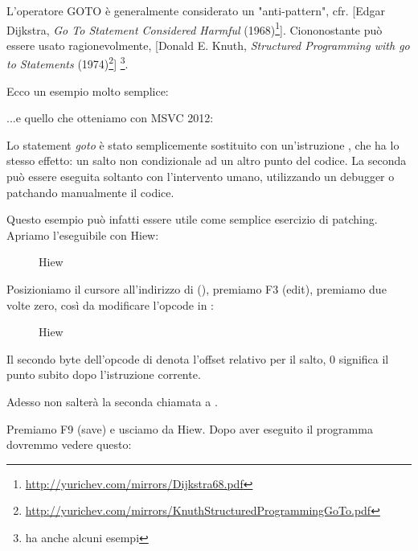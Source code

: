 
L'operatore GOTO è generalmente considerato un "anti-pattern", cfr. [Edgar Dijkstra, \emph{Go To Statement Considered Harmful} (1968)\footnote{\url{http://yurichev.com/mirrors/Dijkstra68.pdf}}].
Ciononostante può essere usato ragionevolmente, [Donald E. Knuth, \emph{Structured Programming with go to Statements} (1974)\footnote{\url{http://yurichev.com/mirrors/KnuthStructuredProgrammingGoTo.pdf}}]
\footnote{\InSqBrackets{\CNotes} ha anche alcuni esempi}.

Ecco un esempio molto semplice:



...e quello che otteniamo con MSVC 2012:



Lo statement \emph{goto} è stato semplicemente sostituito con un'istruzione \JMP, che ha lo stesso effetto: un salto non condizionale
ad un altro punto del codice.
La seconda \printf può essere eseguita soltanto con l'intervento umano, utilizzando un debugger o patchando manualmente il codice.

\par

\clearpage

Questo esempio può infatti essere utile come semplice esercizio di patching. Apriamo l'eseguibile con Hiew:

\begin{figure}[H]
\centering
{}
\caption{Hiew}
\label{fig:goto_hiew1}
\end{figure}

\clearpage
Posizioniamo il cursore all'indirizzo di \JMP (), 
premiamo F3 (edit), premiamo due volte zero, così da modificare l'opcode in :

\begin{figure}[H]
\centering
{}
\caption{Hiew}
\label{fig:goto_hiew2}
\end{figure}

Il secondo byte dell'opcode di \JMP denota l'offset relativo per il salto, 0 significa il punto subito dopo l'istruzione corrente.

Adesso \JMP non salterà la seconda chiamata a \printf.

Premiamo F9 (save) e usciamo da Hiew. Dopo aver eseguito il programma dovremmo vedere questo:

